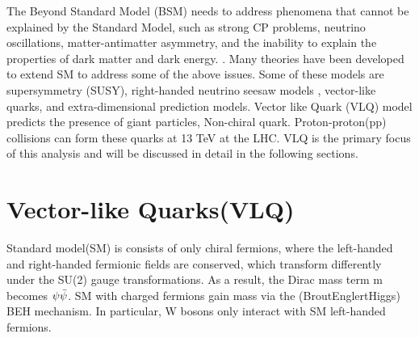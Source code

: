The Beyond Standard Model (BSM) needs to address phenomena that cannot be explained by the Standard Model, such as  strong CP problems, neutrino oscillations, matter-antimatter asymmetry, and the inability to explain the properties of dark matter and dark energy. \cite{https://doi.org/10.48550/arxiv.1202.1391}. Many theories have been developed to extend  SM to address some of the above issues. Some of these models are supersymmetry (SUSY)\cite{MARTIN_1998}, right-handed neutrino seesaw models \cite{neutrino_mass_model}, vector-like quarks, and extra-dimensional prediction models. Vector like Quark (VLQ) model predicts the presence of giant particles, Non-chiral quark. Proton-proton(pp) collisions can form these quarks at 13 TeV at the LHC. VLQ is the primary focus of this analysis and will be discussed in detail in the following sections.




\section{Vector-like Quarks(VLQ)}

Standard model(SM) is consists of only chiral fermions, where the left-handed and right-handed fermionic fields are conserved, which transform differently under the SU(2) gauge transformations. As a result, the Dirac mass term m becomes $\psi\Bar{\psi}$\cite{Aguilar_Arevalo_2018}. SM with charged fermions gain mass via the (BroutEnglertHiggs) BEH mechanism\cite{PhysRevLett.13.321}\cite{Higgs:1964pj}. In particular,  W bosons only interact with SM left-handed fermions. 

